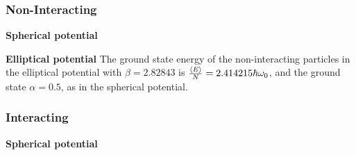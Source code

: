
\subsubsection{Non-Interacting}

\textbf{Spherical potential}


\textbf{Elliptical potential}
The ground state energy of the non-interacting particles in the elliptical potential with $\beta=2.82843$ is $\frac{\expval{E}}{N}=2.414215\hbar\omega_0$, and the ground state $\alpha=0.5$, as in the spherical potential. 



\subsubsection{Interacting}

\textbf{Spherical potential}

